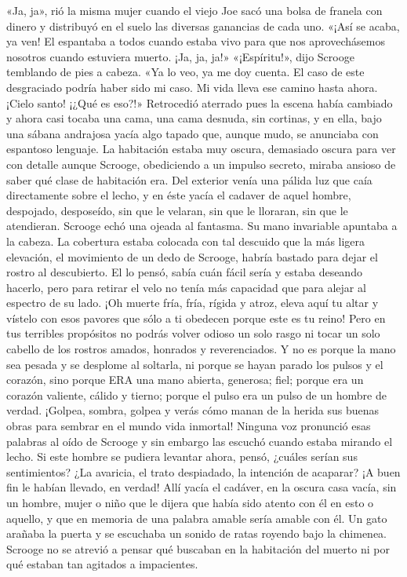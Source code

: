 \documentclass{novela}
\begin{document}
 «Ja, ja», rió la misma mujer cuando el viejo Joe sacó una bolsa de franela con dinero y distribuyó en el suelo las diversas ganancias de cada uno. «¡Así se acaba, ya ven! El espantaba a todos cuando estaba vivo para que nos aprovechásemos nosotros cuando estuviera muerto. ¡Ja, ja, ja!»
 «¡Espíritu!», dijo Scrooge temblando de pies a cabeza. «Ya lo veo, ya me doy cuenta. El caso de este desgraciado podría haber sido mi caso. Mi vida lleva ese camino hasta ahora. ¡Cielo santo! ¡¿Qué es eso?!»
 Retrocedió aterrado pues la escena había cambiado y ahora casi tocaba una cama, una cama desnuda, sin cortinas, y en ella, bajo una sábana andrajosa yacía algo tapado que, aunque mudo, se anunciaba con espantoso lenguaje.
 La habitación estaba muy oscura, demasiado oscura para ver con detalle aunque Scrooge, obediciendo a un impulso secreto, miraba ansioso de saber qué clase de habitación era. Del exterior venía una pálida luz que caía directamente sobre el lecho, y en éste yacía el cadaver de aquel hombre, despojado, desposeído, sin que le velaran, sin que le lloraran, sin que le atendieran.
 Scrooge echó una ojeada al fantasma. Su mano invariable apuntaba a la cabeza. La cobertura estaba colocada con tal descuido que la más ligera elevación, el movimiento de un dedo de Scrooge, habría bastado para dejar el rostro al descubierto. El lo pensó, sabía cuán fácil sería y estaba deseando hacerlo, pero para retirar el velo no tenía más capacidad que para alejar al espectro de su lado.
 ¡Oh muerte fría, fría, rígida y atroz, eleva aquí tu altar y vístelo con esos pavores que sólo a ti obedecen porque este es tu reino! Pero en tus terribles propósitos no podrás volver odioso un solo rasgo ni tocar un solo cabello de los rostros amados, honrados y reverenciados. Y no es porque la mano sea pesada y se desplome al soltarla, ni porque se hayan parado los pulsos y el corazón, sino porque ERA una mano abierta, generosa; fiel; porque era un corazón valiente, cálido y tierno; porque el pulso era un pulso de un hombre de verdad. ¡Golpea, sombra, golpea y verás cómo manan de la herida sus buenas obras para sembrar en el mundo vida inmortal!
 Ninguna voz pronunció esas palabras al oído de Scrooge y sin embargo las escuchó cuando estaba mirando el lecho. Si este hombre se pudiera levantar ahora, pensó, ¿cuáles serían sus sentimientos? ¿La avaricia, el trato despiadado, la intención de acaparar? ¡A buen fin le habían llevado, en verdad!
 Allí yacía el cadáver, en la oscura casa vacía, sin un hombre, mujer o niño que le dijera que había sido atento con él en esto o aquello, y que en memoria de una palabra amable sería amable con él. Un gato arañaba la puerta y se escuchaba un sonido de ratas royendo bajo la chimenea. Scrooge no se atrevió a pensar qué buscaban en la habitación del muerto ni por qué estaban tan agitados a impacientes.
\end{document}
